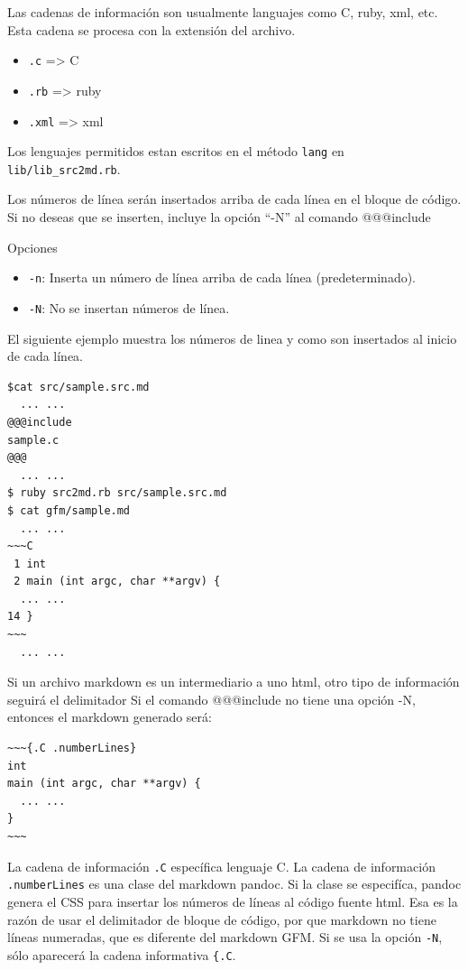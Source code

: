 Las cadenas de información son usualmente languajes como C, ruby, xml,
etc. Esta cadena se procesa con la extensión del archivo.

\begin{itemize}
\tightlist
\item
  \texttt{.c} =\textgreater{} C
\item
  \texttt{.rb} =\textgreater{} ruby
\item
  \texttt{.xml} =\textgreater{} xml
\end{itemize}

Los lenguajes permitidos estan escritos en el método \texttt{lang} en
\texttt{lib/lib\_src2md.rb}.

Los números de línea serán insertados arriba de cada línea en el bloque
de código. Si no deseas que se inserten, incluye la opción ``-N'' al
comando @@@include

Opciones

\begin{itemize}
\tightlist
\item
  \texttt{-n}: Inserta un número de línea arriba de cada línea
  (predeterminado).
\item
  \texttt{-N}: No se insertan números de línea.
\end{itemize}

El siguiente ejemplo muestra los números de linea y como son insertados
al inicio de cada línea.

\begin{verbatim}
$cat src/sample.src.md
  ... ...
@@@include
sample.c
@@@
  ... ...
$ ruby src2md.rb src/sample.src.md
$ cat gfm/sample.md
  ... ...
~~~C
 1 int
 2 main (int argc, char **argv) {
  ... ...
14 }
~~~
  ... ...
\end{verbatim}

Si un archivo markdown es un intermediario a uno html, otro tipo de
información seguirá el delimitador Si el comando @@@include no tiene una
opción -N, entonces el markdown generado será:

\begin{verbatim}
~~~{.C .numberLines}
int
main (int argc, char **argv) {
  ... ...
}
~~~
\end{verbatim}

La cadena de información \texttt{.C} específica lenguaje C. La cadena de
información \texttt{.numberLines} es una clase del markdown pandoc. Si
la clase se especifíca, pandoc genera el CSS para insertar los números
de líneas al código fuente html. Esa es la razón de usar el delimitador
de bloque de código, por que markdown no tiene líneas numeradas, que es
diferente del markdown GFM. Si se usa la opción \texttt{-N}, sólo
aparecerá la cadena informativa \texttt{\{.C}.

